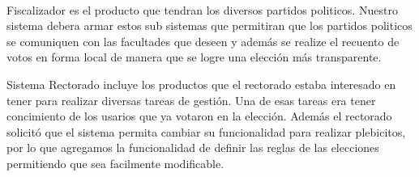 \\ \par
Fiscalizador es el producto que tendran los diversos partidos politicos. Nuestro sistema debera armar estos sub sistemas que permitiran que los partidos politicos se comuniquen con las facultades que deseen y además se realize el recuento de votos en forma local de manera que se logre una elección más transparente. 
\\ \par
Sistema Rectorado incluye los productos que el rectorado estaba interesado en tener para realizar diversas tareas de gestión. Una de esas tareas era tener concimiento de los usarios que ya votaron en la elección. Además el rectorado solicitó que el sistema permita cambiar su funcionalidad para realizar plebicitos, por lo que agregamos la funcionalidad de definir las reglas de las elecciones permitiendo que sea facilmente modificable.

